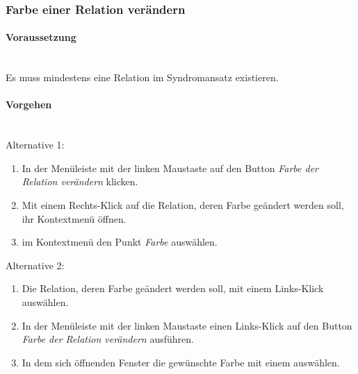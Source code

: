 \documentclass[enabledeprecatedfontcommands,fontsize=11pt,paper=a4,twoside]{scrartcl}
\newcommand*{\condition}{\paragraph{Voraussetzung}$\;$ \vspace{0.2cm}\\}
\newcommand*{\actions}{\paragraph{Vorgehen} $\;$\vspace{0.2cm}\\}
\begin{document}
		\subsubsection{Farbe einer Relation verändern}
		\condition
		Es muss mindestens eine Relation im Syndromansatz existieren.
		\actions
		Alternative 1:
		\begin{enumerate}
			\item In der Menüleiste mit der linken Maustaste auf den Button \textit{Farbe der Relation verändern} klicken.
			\item Mit einem Rechts-Klick auf die Relation, deren Farbe geändert werden soll, ihr Kontextmenü öffnen.
			\item im Kontextmenü den Punkt \textit{Farbe} auswählen.
		\end{enumerate}
		Alternative 2:
		\begin{enumerate}
			\item Die Relation, deren Farbe geändert werden soll, mit einem Links-Klick auswählen.
			\item In der Menüleiste mit der linken Maustaste einen Links-Klick auf den Button \textit{Farbe der Relation verändern} ausführen.
			\item In dem sich öffnenden Fenster die gewünschte Farbe mit einem auswählen.
		\end{enumerate}	
		
		\newpage
\end{document}
